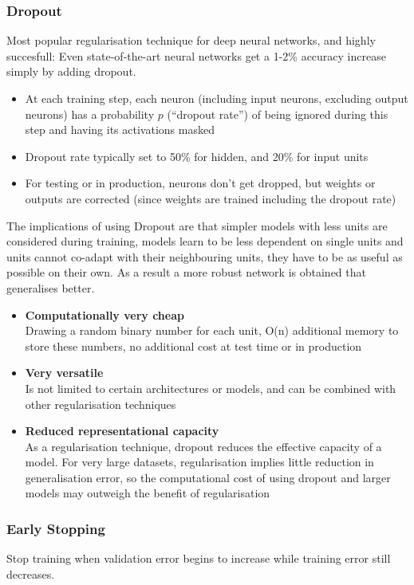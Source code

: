 \documentclass[11pt]{article}
\begin{document}
\subsubsection{Dropout}
Most popular regularisation technique for deep neural networks, and highly succesfull: Even state-of-the-art neural networks get a 1-2\% accuracy increase simply by adding dropout.
\begin{itemize}
	\item At each training step, each neuron (including input neurons, excluding output neurons) has a probability $p$ (“dropout rate”) of being ignored during this step and having its activations masked
	\item Dropout rate typically set to 50\% for hidden, and 20\% for input units
	\item For testing or in production, neurons don’t get dropped, but weights or outputs are corrected (since weights are trained including the dropout rate)
\end{itemize}

The implications of using Dropout are that simpler models with less units are considered during training, models learn to be less dependent on single units and units cannot co-adapt with their neighbouring units, they have to be as useful as possible on their own. As a result a more robust network is obtained that generalises better.

\begin{itemize}
	\item \textbf{Computationally very cheap}\\
	Drawing a random binary number for each unit, O(n) additional memory to store these numbers, no additional cost at test time or in production
	\item \textbf{Very versatile}\\
	Is not limited to certain architectures or models, and can be combined with other regularisation techniques
	\item \textbf{Reduced representational capacity}\\
	As a regularisation technique, dropout reduces the effective capacity of a model. For very large datasets, regularisation implies little reduction in generalisation error, so the computational cost of using dropout and larger models may outweigh the benefit of regularisation
\end{itemize}

\subsubsection{Early Stopping}
Stop training when validation error begins to increase while training error still decreases.
\end{document}
